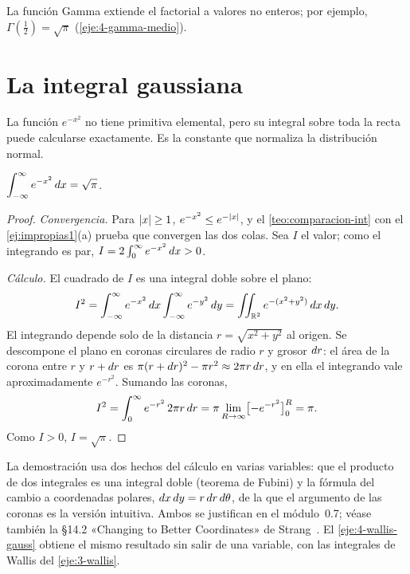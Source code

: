 La función Gamma extiende el factorial a valores no enteros; por ejemplo, $\Gamma(\frac12)=\sqrt\pi$ (\cref{eje:4-gamma-medio}).

\section{La integral gaussiana}

La función $e^{-x^{2}}$ no tiene primitiva elemental, pero su integral sobre toda la recta puede calcularse exactamente. Es la constante que normaliza la distribución normal.

\begin{teorema}\label{teo:gauss}
$\displaystyle\int_{-\infty}^{\infty}e^{-x^{2}}\mathop{}\!d x=\sqrt\pi$.
\end{teorema}

\begin{proof}
\emph{Convergencia.} Para $\lvert x\rvert\ge1$, $e^{-x^{2}}\le e^{-\lvert x\rvert}$, y el \cref{teo:comparacion-int} con el \cref{ej:impropias1}(a) prueba que convergen las dos colas. Sea $I$ el valor; como el integrando es par, $I=2\int_0^\infty e^{-x^2}\mathop{}\!d x>0$.

\emph{Cálculo.} El cuadrado de $I$ es una integral doble sobre el plano:
\[
I^{2}=\int_{-\infty}^{\infty}e^{-x^{2}}\mathop{}\!d x\int_{-\infty}^{\infty}e^{-y^{2}}\mathop{}\!d y=\iint_{\mathbb{R}^{2}}e^{-(x^{2}+y^{2})}\mathop{}\!d x\mathop{}\!d y .
\]
El integrando depende solo de la distancia $r=\sqrt{x^{2}+y^{2}}$ al origen. Se descompone el plano en coronas circulares de radio $r$ y grosor $\mathop{}\!d r$: el área de la corona entre $r$ y $r+\mathop{}\!d r$ es $\pi(r+\mathop{}\!d r)^{2}-\pi r^{2}\approx2\pi r\mathop{}\!d r$, y en ella el integrando vale aproximadamente $e^{-r^{2}}$. Sumando las coronas,
\[
I^{2}=\int_0^{\infty}e^{-r^{2}}\,2\pi r\mathop{}\!d r=\pi\lim_{R\to\infty}\bigl[-e^{-r^{2}}\bigr]_{0}^{R}=\pi .
\]
Como $I>0$, $I=\sqrt\pi$.
\end{proof}

\begin{observacion}
La demostración usa dos hechos del cálculo en varias variables: que el producto de dos integrales es una integral doble (teorema de Fubini) y la fórmula del cambio a coordenadas polares, $\mathop{}\!d x\mathop{}\!d y=r\mathop{}\!d r\mathop{}\!d\theta$, de la que el argumento de las coronas es la versión intuitiva. Ambos se justifican en el módulo~0.7; véase también la §14.2 «Changing to Better Coordinates» de Strang~\cite{strang}. El \cref{eje:4-wallis-gauss} obtiene el mismo resultado sin salir de una variable, con las integrales de Wallis del \cref{eje:3-wallis}.
\end{observacion}

